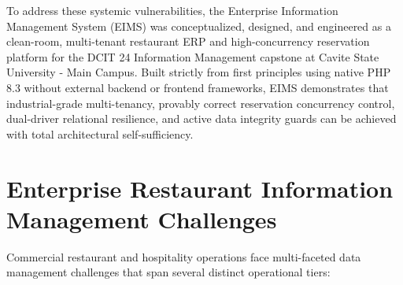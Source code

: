 To address these systemic vulnerabilities, the Enterprise Information Management System (EIMS) was conceptualized, designed, and engineered as a clean-room, multi-tenant restaurant ERP and high-concurrency reservation platform for the DCIT 24 Information Management capstone at Cavite State University - Main Campus. Built strictly from first principles using native PHP 8.3 without external backend or frontend frameworks, EIMS demonstrates that industrial-grade multi-tenancy, provably correct reservation concurrency control, dual-driver relational resilience, and active data integrity guards can be achieved with total architectural self-sufficiency.

\section{Enterprise Restaurant Information Management Challenges}
\label{sec:intro_challenges}
Commercial restaurant and hospitality operations face multi-faceted data management challenges that span several distinct operational tiers:


